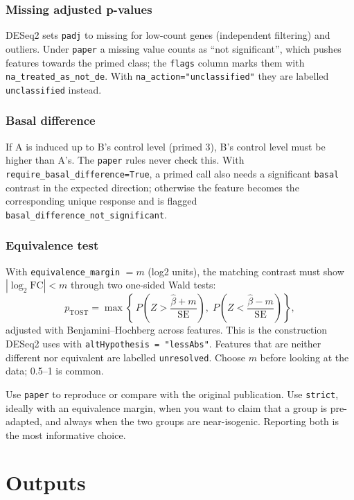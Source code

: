 \documentclass[11pt,a4paper]{article}
\newcommand{\code}[1]{\texttt{\color{navy!85!black}#1}}
\begin{document}
\subsubsection*{Missing adjusted p-values}
DESeq2 sets \code{padj} to missing for low-count genes (independent filtering) and outliers. Under
\code{paper} a missing value counts as ``not significant'', which pushes features towards
the primed class; the \code{flags} column marks them with \code{na\_treated\_as\_not\_de}. With
\code{na\_action="unclassified"} they are labelled \code{unclassified} instead.

\subsubsection*{Basal difference}
If A is induced up to B's control level (primed 3), B's control level must be higher than A's.
The \code{paper} rules never check this. With \code{require\_basal\_difference=True}, a primed call
also needs a significant \code{basal} contrast in the expected direction; otherwise the feature becomes
the corresponding unique response and is flagged \code{basal\_difference\_not\_significant}.

\subsubsection*{Equivalence test}
With \code{equivalence\_margin} \(=m\) (log2 units), the matching contrast must show
\(|\log_2\mathrm{FC}|<m\) through two one-sided Wald tests:
\[
p_{\mathrm{TOST}} = \max\left\{\, P\!\left(Z > \frac{\widehat{\beta}+m}{\mathrm{SE}}\right),\;
                               P\!\left(Z < \frac{\widehat{\beta}-m}{\mathrm{SE}}\right) \right\},
\]
adjusted with Benjamini--Hochberg across features. This is the construction DESeq2 uses with
\code{altHypothesis = "lessAbs"}. Features that are neither different nor equivalent are labelled
\code{unresolved}. Choose \(m\) before looking at the data; 0.5--1 is common.

\begin{note}
Use \code{paper} to reproduce or compare with the original publication. Use \code{strict}, ideally with
an equivalence margin, when you want to claim that a group is pre-adapted, and always when the two
groups are near-isogenic. Reporting both is the most informative choice.
\end{note}

\section{Outputs}
\label{sec:outputs}
\end{document}
